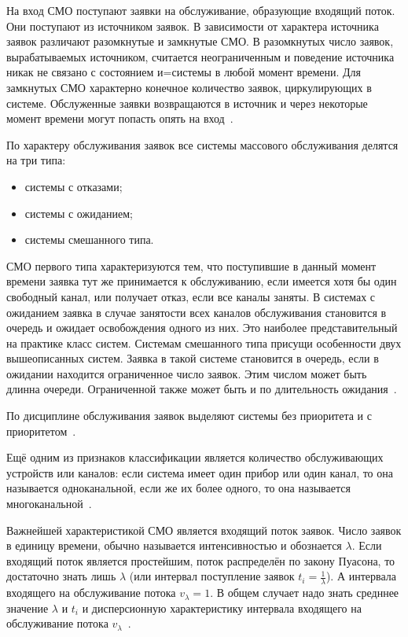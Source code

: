 На вход СМО поступают заявки на обслуживание, образующие входящий поток. Они поступают из источником заявок. В зависимости от характера источника заявок различают разомкнутые и замкнутые СМО. В разомкнутых число заявок, вырабатываемых источником, считается неограниченным и поведение источника никак не связано с состоянием и=системы в любой момент времени. Для замкнутых СМО характерно конечное количество заявок, циркулирующих в системе. Обслуженные заявки возвращаются в источник и через некоторые момент времени могут попасть опять на вход~\cite{ak_det}.

По характеру обслуживания заявок все системы массового обслуживания делятся на три типа:
\begin{itemize}[label=---]
	\item системы с отказами;
	\item системы с ожиданием;
	\item системы смешанного типа.
\end{itemize}
СМО первого типа характеризуются тем, что поступившие в данный момент времени заявка тут же принимается к обслуживанию, если имеется хотя бы один свободный канал, или получает отказ, если все каналы заняты. В системах с ожиданием заявка в случае занятости всех каналов обслуживания становится в очередь и ожидает освобождения одного из них. Это наиболее представительный на практике класс систем. Системам смешанного типа присущи особенности двух вышеописанных систем. Заявка в такой системе становится в очередь, если в ожидании находится ограниченное число заявок. Этим числом может быть длинна очереди. Ограниченной также может быть и по длительность ожидания~\cite{smo}.

По дисциплине обслуживания заявок выделяют системы без приоритета и с приоритетом~\cite{smo}.

Ещё одним из признаков классификации является количество обслуживающих устройств или каналов: если система имеет один прибор или один канал, то она называется одноканальной, если же их более одного, то она называется многоканальной~\cite{smo_chan}. 

Важнейшей характеристикой СМО является входящий поток заявок. Число заявок в единицу времени, обычно называется интенсивностью и обознается $\lambda$. Если входящий поток является простейшим, поток распределён по закону Пуасона, то достаточно знать лишь $\lambda$ (или интервал поступление заявок $t_i = \frac{1}{\lambda}$). А интервала входящего на обслуживание потока $v_\lambda = 1$. В общем случает надо знать средннее значение $\lambda$ и $t_i$ и дисперсионную характеристику интервала входящего на обслуживание потока $v_\lambda$~\cite{smo}.

